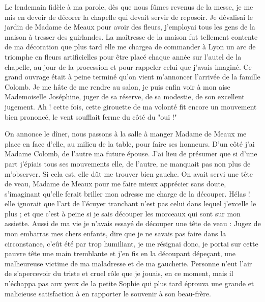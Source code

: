 \documentclass[11pt,a4paper]{report}
\begin{document}
Le lendemain fidèle à ma parole, dès que nous fûmes revenus de la messe, je me mis en devoir de décorer la chapelle qui devait servir de reposoir. Je dévalisai le jardin de Madame de Meaux pour avoir des fleurs, j'employai tous les gens de la maison à tresser des guirlandes. La maîtresse de la maison fut tellement contente de ma décoration que plus tard elle me chargea de commander à Lyon un arc de triomphe en fleurs artificielles pour être placé chaque année sur l'autel de la chapelle, au jour de la procession et pour rappeler celui que j'avais imaginé. Ce grand ouvrage était à peine terminé qu'on vient m'annoncer l'arrivée de la famille Colomb. Je me hâte de me rendre au salon, je puis enfin voir à mon aise Mademoiselle Joséphine, juger de sa réserve, de sa modestie, de son excellent jugement. Ah ! cette fois, cette girouette de ma volonté fit encore un mouvement bien prononcé, le vent soufflait ferme du côté du "oui !"

On annonce le dîner, nous passons à la salle à manger Madame de Meaux me place en face d'elle, au milieu de la table, pour faire ses honneurs. D'un côté j'ai Madame Colomb, de l'autre ma future épouse. J'ai lieu de présumer que si d'une part j'épiais tous ses mouvements elle, de l'autre, ne manquait pas non plus de m'observer. Si cela est, elle dût me trouver bien gauche. On avait servi une tête de veau, Madame de Meaux pour me faire mieux apprécier sans doute, s'imaginant qu'elle ferait briller mon adresse me charge de la découper. Hélas ! elle ignorait que l'art de l'écuyer tranchant n'est pas celui dans lequel j'excelle le plus ; et que c'est à peine si je sais découper les morceaux qui sont sur mon assiette. Aussi de ma vie je n'avais essayé de découper une tête de veau : Jugez de mon embarras mes chers enfants, dire que je ne savais pas faire dans la circonstance, c'eût été par trop humiliant, je me résignai donc, je portai sur cette pauvre tête une main tremblante et j'en fis en la découpant dépeçant, une malheureuse victime de ma maladresse et de ma gaucherie. Personne n'eut l'air de s'apercevoir du triste et cruel rôle que je jouais, en ce moment, mais il n'échappa pas aux yeux de la petite Sophie qui plus tard éprouva une grande et malicieuse satisfaction à en rapporter le souvenir à son beau-frère.
\end{document}
